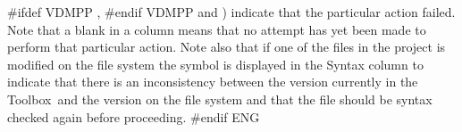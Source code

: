 \documentclass[\pformat,12pt]{article}
\newcommand{\Toolbox}{Toolbox}
\newcommand{\Toolbox}{Toolbox}
\newcommand{\guicmd}[1]{{\sf #1}}
\newcommand{\guicmd}[1]{{\gt #1}}
\begin{document}
#ifdef VDMPP
,
#endif VDMPP
and
)
indicate that the particular action failed. Note that a blank in a
column means that no attempt has yet been made to perform that
particular action. Note also that if one of the files in the project
is modified on the file system the symbol
is displayed in the \guicmd{Syntax} column  to indicate
that there is an inconsistency between the version currently in the \Toolbox\ and the
version on the file system and that the file should be syntax checked
again before proceeding.
#endif ENG
\end{document}

